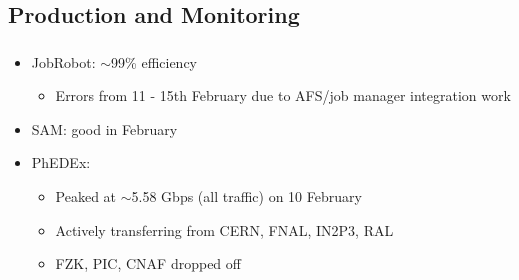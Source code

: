 \documentclass{beamer}
\newcommand{\ca}{\ensuremath{\sim}}
\begin{document}
\subsection{Production and Monitoring}
\begin{frame}
\frametitle{}
\begin{itemize}
    \item JobRobot: \ca{}99\% efficiency
    \begin{itemize}
        \item Errors from 11 - 15th February due to AFS/job manager integration work
    \end{itemize}
    \item SAM: good in February
    \item PhEDEx:
    \begin{itemize}
        \item Peaked at \ca{}5.58 Gbps (all traffic) on 10 February
        \item Actively transferring from CERN, FNAL, IN2P3, RAL
        \item FZK, PIC, CNAF dropped off
    \end{itemize}
\end{itemize}
\end{frame}
\end{document}
